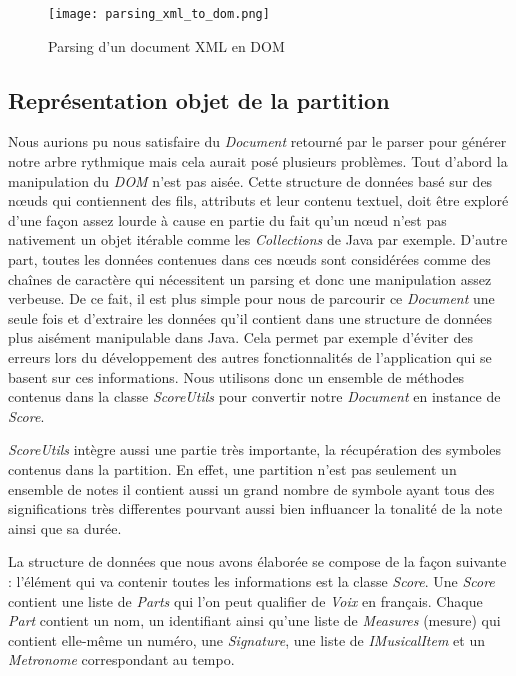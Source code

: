 \begin{figure}[!h]
\centering
\texttt{[image: parsing\_xml\_to\_dom.png]}\\[1cm]
\caption{Parsing d'un document XML en DOM}
\label{Parsing d'un document XML en DOM}
\end{figure}


\subsection{Représentation objet de la partition}

\par
Nous aurions pu nous satisfaire du \emph{Document} retourné par le parser pour
générer notre arbre rythmique mais cela aurait posé plusieurs problèmes. Tout d'abord
la manipulation du \emph{DOM} n'est pas aisée. Cette structure de données basé sur
des nœuds qui contiennent des fils, attributs et leur contenu textuel, doit
être exploré d'une façon assez lourde à cause en partie du fait qu'un nœud n'est
pas nativement un objet itérable comme les \emph{Collections} de Java par exemple.
D'autre part, toutes les données contenues dans ces nœuds sont considérées comme des chaînes
de caractère qui nécessitent un parsing et donc une manipulation assez verbeuse.
De ce fait, il est plus simple pour nous de parcourir ce \emph{Document} une seule fois et d'extraire les données qu'il
contient dans une structure de données plus aisément manipulable dans Java. Cela
permet par exemple d'éviter des erreurs lors du développement des autres fonctionnalités de
l'application qui se basent sur ces informations. Nous utilisons donc un ensemble de méthodes
contenus dans la classe \emph{ScoreUtils} pour convertir notre \emph{Document} en instance de \emph{Score}.

\par
\emph{ScoreUtils} intègre aussi une partie très importante, la récupération des symboles contenus dans la partition.
En effet, une partition n'est pas seulement un ensemble de notes il contient aussi un grand nombre de symbole ayant
tous des significations très differentes pourvant aussi bien influancer la tonalité de la note ainsi que sa durée.


\par
La structure de données que nous avons élaborée se compose de la façon suivante :
l'élément qui va contenir toutes les informations est la classe \emph{Score}. Une
\emph{Score} contient une liste de \emph{Parts} qui l'on peut qualifier de
\emph{Voix} en français. Chaque \emph{Part} contient un nom, un identifiant ainsi qu'une liste
de \emph{Measures} (mesure) qui contient elle-même un numéro, une \emph{Signature}, une
liste de \emph{IMusicalItem} et un \emph{Metronome} correspondant au tempo.

